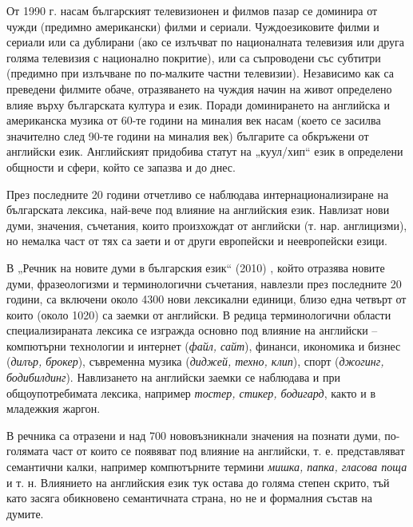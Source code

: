 \begin{multicols}{2}
  От 1990 г. насам българският телевизионен и филмов пазар се доминира от чужди (предимно американски) филми и сериали. Чуждоезиковите филми и сериали или са дублирани (ако
   се излъчват по националната телевизия или друга
   голяма телевизия с национално покритие), или са
   съпроводени със субтитри (предимно при излъчване по
   по-малките частни телевизии). Независимо как са
   преведени филмите обаче, отразяването на чуждия начин на живот
   определено влияе върху българската култура и
   език. Поради
   доминирането
   на
   английска и американска музика от 60-те години на миналия век насам (което се засилва значително след
   90-те години на миналия век) българите
  са обкръжени от английски език.
   Английският придобива статут на „куул/хип“
   език в определени общности и сфери, който се запазва и до днес. 

  През последните 20 години отчетливо се наблюдава интернационализиране на българската лексика, най-вече под влияние на английския език. Навлизат нови думи, значения, съчетания, които произхождат от английски (т. нар. англицизми), но немалка част от тях са заети и от други европейски и неевропейски езици.


  В „Речник на новите думи в българския език“ (2010) \cite{NWDict}, който отразява новите думи, фразеологизми и
   терминологични съчетания, навлезли през последните 20 години,
   са включени около 4300 нови лексикални единици,
   близо една четвърт от които (около 1020) са заемки от
   английски. В редица терминологични области
   специализираната лексика се изгражда основно под
   влияние на английски – компютърни технологии и
   интернет ({\it файл, сайт}), финанси, икономика и бизнес
   ({\it дилър, брокер}), съвременна музика ({\it диджей, техно, клип}),
   спорт ({\it джогинг, бодибилдинг}). Навлизането на английски
   заемки се наблюдава и при общоупотребимата лексика, например {\it тостер, стикер, бодигард}, както и в младежкия
   жаргон.

  В речника са отразени и над 700 нововъзникнали значения на познати думи, по-голямата част от които се появяват под влияние на английски, т. е. представляват
   семантични калки, например компютърните термини
  \textit{мишка, папка, гласова поща} и т. н. Влиянието на
   английския език тук остава до голяма степен скрито, тъй
   като засяга обикновено семантичната страна, но не и
   формалния състав на думите. 


\end{multicols}

